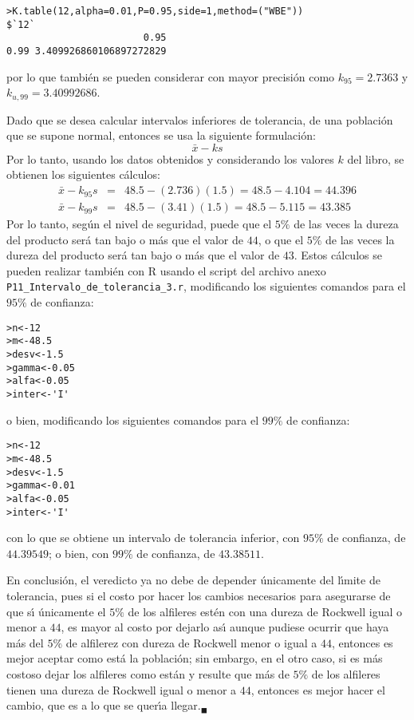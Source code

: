 \begin{solucion}
\begin{verbatim}
>K.table(12,alpha=0.01,P=0.95,side=1,method=("WBE"))
$`12`
                        0.95
0.99 3.409926860106897272829
 \end{verbatim}
 \vspace{-0.5cm}
 por lo que tambi\'en se pueden considerar con mayor precisi\'on como $k_{95} = 2.7363$ y $k_{u,99} = 3.40992686$.
 \par 
 Dado que se desea calcular intervalos inferiores de tolerancia, de una poblaci\'on que se supone normal, entonces se usa la siguiente formulaci\'on:
 \begin{equation*}
  \bar{x}-ks
 \end{equation*}
 Por lo tanto, usando los datos obtenidos y considerando los valores $k$ del libro, se obtienen los siguientes c\'alculos:
 \begin{eqnarray*}
  \bar{x} - k_{95}s & = & 48.5 - (2.736)(1.5) = 48.5 - 4.104 = 44.396 \\
  \bar{x} - k_{99}s & = & 48.5 - (3.41)(1.5) = 48.5 - 5.115 = 43.385
 \end{eqnarray*}
 Por lo tanto, seg\'un el nivel de seguridad, puede que el $5\%$ de las veces la dureza del producto ser\'a tan bajo o m\'as que el valor de $44$, o que el $5\%$ de las veces la dureza del producto ser\'a tan bajo o m\'as que el valor de $43$. Estos c\'alculos se pueden realizar tambi\'en con R usando el script del archivo anexo \texttt{P11\_Intervalo\_de\_tolerancia\_3.r}, modificando los siguientes comandos para el $95\%$ de confianza:
 \begin{verbatim}
>n<-12
>m<-48.5
>desv<-1.5
>gamma<-0.05
>alfa<-0.05
>inter<-'I'
 \end{verbatim}
 \vspace{-0.5cm}
 o bien, modificando los siguientes comandos para el $99\%$ de confianza:
 \begin{verbatim}
>n<-12
>m<-48.5
>desv<-1.5
>gamma<-0.01
>alfa<-0.05
>inter<-'I'
 \end{verbatim}
 \vspace{-0.5cm}
 con lo que se obtiene un intervalo de tolerancia inferior, con $95\%$ de confianza, de $44.39549$; o bien, con $99\%$ de confianza, de $43.38511$.
 \par 
 En conclusi\'on, el veredicto ya no debe de depender \'unicamente del l\'{\i}mite de tolerancia, pues si el costo por hacer los cambios necesarios para asegurarse de que s\'{\i} \'unicamente el $5\%$ de los alfileres est\'en con una dureza de Rockwell igual o menor a $44$, es mayor al costo por dejarlo as\'{\i} aunque pudiese ocurrir que haya m\'as del $5\%$ de alfilerez con dureza de Rockwell menor o igual a $44$, entonces es mejor aceptar como est\'a la poblaci\'on; sin embargo, en el otro caso, si es m\'as costoso dejar los alfileres como est\'an y resulte que m\'as de $5\%$ de los alfileres tienen una dureza de Rockwell igual o menor a $44$, entonces es mejor hacer el cambio, que es a lo que se quer\'{\i}a llegar.${}_{\blacksquare}$
\end{solucion}
